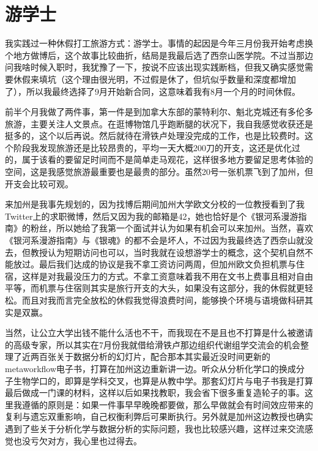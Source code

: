 \documentclass[
  letterpaper,
  DIV=11,
  numbers=noendperiod]{scrreprt}
\begin{document}
\section{游学士}\label{ux6e38ux5b66ux58eb}

我实践过一种休假打工旅游方式：游学士。事情的起因是今年三月份我开始考虑换个地方做博后，这个故事比较曲折，结局是我最后选了西奈山医学院。不过当那边问我啥时候入职时，我犹豫了一下，按说不应该出现实践断档，但我又确实感觉需要休假来填坑（这个理由很光明，不过假是休了，但坑似乎数量和深度都增加了），所以我最终选择了9月开始新合同，这意味着我有8月一个月的时间休假。

前半个月我做了两件事，第一件是到加拿大东部的蒙特利尔、魁北克城还有多伦多旅游，主要关注人文景点。在逛博物馆几乎跑断腿的状况下，我自我感觉收获还是挺多的，这个以后再说。然后就待在滑铁卢处理没完成的工作，也是比较费时。这个阶段我发现旅游还是比较昂贵的，平均一天大概200刀的开支，这还是优化过的，属于该看的要留足时间而不是简单走马观花，这样很多地方要留足思考体验的空间，这是我感觉旅游最重要也是最贵的部分。虽然20号一张机票飞到了加州，但开支会比较可观。

来加州是我事先规划的，因为找博后期间加州大学欧文分校的一位教授看到了我Twitter上的求职微博，然后又因为我的邮箱是42，她也恰好是个《银河系漫游指南》的粉丝，所以她给了我第一个面试并认为如果有机会可以来加州。当然，喜欢《银河系漫游指南》与《银魂》的都不会是坏人，不过因为我最终选了西奈山就没去，但教授认为短期访问也可以，当时我就在设想游学士的概念，这个契机自然不能放过。最后我们达成的协议是我不拿工资访问两周，但加州欧文负担机票与住宿，这样是对我最没压力的方式。不拿工资意味着我不用在文书上费事且相对自由平等，而机票与住宿则其实是旅行开支的大头，如果没有这部分，我的休假就更轻松。而且对我而言完全放松的休假我觉得浪费时间，能够换个环境与语境做科研其实是双赢。

当然，让公立大学出钱不能什么活也不干，而我现在不是且也不打算是什么被邀请的高级专家，所以其实在7月份我就借给滑铁卢那边组织代谢组学交流会的机会整理了近两百张关于数据分析的幻灯片，配合那本其实最近没时间更新的metaworkflow电子书，打算在加州这边重新讲一边。听众从分析化学口的换成分子生物学口的，即算是学科交叉，也算是从教中学。那套幻灯片与电子书我是打算最后做成一门课的材料，这样以后如果找教职，我会省下很多重复造轮子的事。这里我遵循的原则是：如果一件事早早晚晚都要做，那么早做就会有时间效应带来的复利与遗忘双重影响，自己权衡利弊后可果断执行。另外就是加州这边教授也确实遇到了些关于分析化学与数据分析的实际问题，我也比较感兴趣，这样过来交流感觉也没亏欠对方，我心里也过得去。
\end{document}
